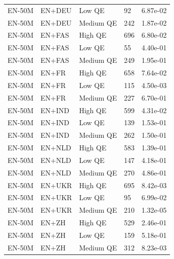 \begin{tabular}{@{}llllr@{}}
EN-50M & EN+DEU & Low QE & 92 & 6.87e-02 \\
EN-50M & EN+DEU & Medium QE & 242 & 1.87e-02 \\
EN-50M & EN+FAS & High QE & 696 & 6.80e-02 \\
EN-50M & EN+FAS & Low QE & 55 & 4.40e-01 \\
EN-50M & EN+FAS & Medium QE & 249 & 1.95e-01 \\
EN-50M & EN+FR & High QE & 658 & 7.64e-02 \\
EN-50M & EN+FR & Low QE & 115 & 4.50e-03 \\
EN-50M & EN+FR & Medium QE & 227 & 6.70e-01 \\
EN-50M & EN+IND & High QE & 599 & 4.31e-02 \\
EN-50M & EN+IND & Low QE & 139 & 1.53e-01 \\
EN-50M & EN+IND & Medium QE & 262 & 1.50e-01 \\
EN-50M & EN+NLD & High QE & 583 & 1.39e-01 \\
EN-50M & EN+NLD & Low QE & 147 & 4.18e-01 \\
EN-50M & EN+NLD & Medium QE & 270 & 4.86e-01 \\
EN-50M & EN+UKR & High QE & 695 & 8.42e-03 \\
EN-50M & EN+UKR & Low QE & 95 & 6.99e-02 \\
EN-50M & EN+UKR & Medium QE & 210 & 1.32e-05 \\
EN-50M & EN+ZH & High QE & 529 & 2.46e-01 \\
EN-50M & EN+ZH & Low QE & 159 & 5.18e-01 \\
EN-50M & EN+ZH & Medium QE & 312 & 8.23e-03 \\
\bottomrule
\end{tabular}
